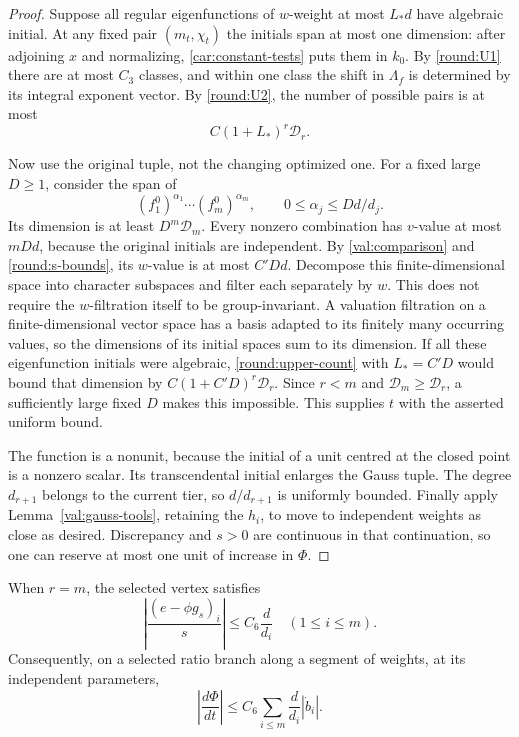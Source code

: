 \begin{proof}
Suppose all regular eigenfunctions of $w$-weight at most $L_*d$
have algebraic initial. At any fixed pair $(m_t,\chi_t)$ the
initials span at most one dimension: after adjoining $x$ and
normalizing, \eqref{car:constant-tests} puts them in $k_0$.
By \eqref{round:U1} there are at most $C_3$ classes, and within
one class the shift in $\Lambda_f$ is determined by its integral
exponent vector. By \eqref{round:U2}, the number of possible
pairs is at most
\begin{equation}\label{round:upper-count}
 C(1+L_*)^r\mathcal D_r.
\end{equation}

Now use the original tuple, not the changing optimized one.
For a fixed large $D\ge1$, consider the span of
\[
 (f_1^0)^{\alpha_1}\cdots(f_m^0)^{\alpha_m},
 \qquad 0\le\alpha_j\le Dd/d_j.
\]
Its dimension is at least $D^m\mathcal D_m$. Every nonzero
combination has $v$-value at most $mDd$, because the original
initials are independent. By \eqref{val:comparison} and
\eqref{round:s-bounds}, its $w$-value is at most $C'Dd$.
Decompose this finite-dimensional space into character subspaces
and filter each separately by $w$. This does not require the
$w$-filtration itself to be group-invariant. A valuation
filtration on a finite-dimensional vector space has a basis
adapted to its finitely many occurring values, so the dimensions
of its initial spaces sum to its dimension. If all these
eigenfunction initials were algebraic, \eqref{round:upper-count}
with $L_*=C'D$ would bound that dimension by
$C(1+C'D)^r\mathcal D_r$. Since $r<m$ and
$\mathcal D_m\ge\mathcal D_r$, a sufficiently large fixed $D$
makes this impossible. This supplies $t$ with the asserted
uniform bound.

The function is a nonunit, because the initial of a unit centred
at the closed point is a nonzero scalar. Its transcendental
initial enlarges the Gauss tuple. The degree $d_{r+1}$ belongs
to the current tier, so $d/d_{r+1}$ is uniformly bounded.
Finally apply Lemma~\ref{val:gauss-tools}, retaining the $h_i$,
to move to independent weights as close as desired. Discrepancy
and $s>0$ are continuous in that continuation, so one can
reserve at most one unit of increase in $\Phi$.
\end{proof}

\begin{lemma}\label{round:derivative}
When $r=m$, the selected vertex satisfies
\begin{equation}\label{round:U3}
 \left|\frac{(e-\phi g_s)_i}{s}\right|
       \le C_6\frac d{d_i}\quad(1\le i\le m).
\end{equation}
Consequently, on a selected ratio branch along a segment of
weights, at its independent parameters,
\begin{equation}\label{round:derivative-bound}
 \left|\frac{d\Phi}{dt}\right|
 \le C_6\sum_{i\le m}\frac d{d_i}|\dot b_i|.
\end{equation}
\end{lemma}

